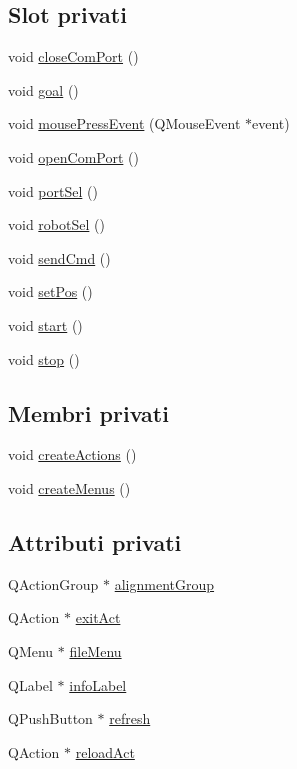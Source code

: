 \subsection*{Slot privati}
\begin{CompactItemize}
\item 
void \hyperlink{classMainWindow_501f096e32ac1de50b0e913803bdd4e8}{close\-Com\-Port} ()
\item 
void \hyperlink{classMainWindow_b20c1e3dbb16cd45ef4f697ce0fb11f7}{goal} ()
\item 
void \hyperlink{classMainWindow_d2272e344e46519f026cd02f419884f1}{mouse\-Press\-Event} (QMouse\-Event $\ast$event)
\item 
void \hyperlink{classMainWindow_faf58be398c427554d4bef465eff4be0}{open\-Com\-Port} ()
\item 
void \hyperlink{classMainWindow_7fea2f4466d9b971fbe4142743a8e3cb}{port\-Sel} ()
\item 
void \hyperlink{classMainWindow_50c5e9556f3dfc6de8e0b064d10aa21f}{robot\-Sel} ()
\item 
void \hyperlink{classMainWindow_0cb6bab0d23b55595337ae6f9e8eba32}{send\-Cmd} ()
\item 
void \hyperlink{classMainWindow_d6073419da050a8657f4adf01acfd2d0}{set\-Pos} ()
\item 
void \hyperlink{classMainWindow_60de64d75454385b23995437f1d72669}{start} ()
\item 
void \hyperlink{classMainWindow_8c528baf37154d347366083f0f816846}{stop} ()
\end{CompactItemize}
\subsection*{Membri privati}
\begin{CompactItemize}
\item 
void \hyperlink{classMainWindow_5176c9496a29e21eacb0f81ca1a29923}{create\-Actions} ()
\item 
void \hyperlink{classMainWindow_5c788b6fcb676c3e1cef7e01eed9a420}{create\-Menus} ()
\end{CompactItemize}
\subsection*{Attributi privati}
\begin{CompactItemize}
\item 
QAction\-Group $\ast$ \hyperlink{classMainWindow_76d93e5045032189c41520235a2196b9}{alignment\-Group}
\item 
QAction $\ast$ \hyperlink{classMainWindow_d618b0cff61434478d762e93add5189e}{exit\-Act}
\item 
QMenu $\ast$ \hyperlink{classMainWindow_db1ab65d1aecac73e58f48557c143b2e}{file\-Menu}
\item 
QLabel $\ast$ \hyperlink{classMainWindow_1778899fb8e16670083da66e055500d0}{info\-Label}
\item 
QPush\-Button $\ast$ \hyperlink{classMainWindow_07ba2d7080a0f0cf1ab683bfe6b80156}{refresh}
\item 
QAction $\ast$ \hyperlink{classMainWindow_168587cb4c00ec6773174b004268191d}{reload\-Act}
\end{CompactItemize}



